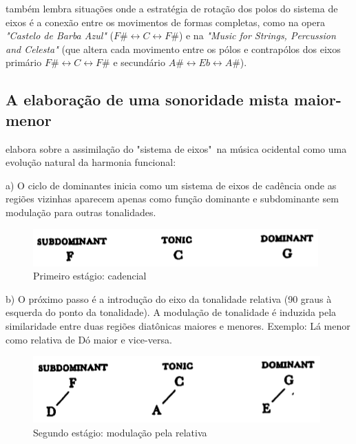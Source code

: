 \documentclass[
	12pt,				%
	openright,			%
	twoside,			%
	a4paper,			%
	english,			%
	french,				%
	spanish,			%
	brazil				%
	]{abntex2}
\begin{document}
 também lembra situações onde a estratégia de rotação dos polos do sistema de eixos é a conexão entre os movimentos de formas completas, como na opera \textit{"Castelo de Barba Azul"} ($F\# \leftrightarrow  C \leftrightarrow F\#$) e na \textit{"Music for Strings, Percussion and Celesta" } (que altera cada movimento entre os pólos e contrapólos dos eixos primário $F\# \leftrightarrow  C \leftrightarrow F\#$ e secundário $A\# \leftrightarrow  Eb \leftrightarrow A\#$).
\pagebreak


\subsection{A elaboração de uma sonoridade mista maior-menor}

 elabora sobre a assimilação do "sistema de eixos"\ na música ocidental como uma evolução natural da harmonia funcional: 

a) O ciclo de dominantes inicia como um sistema de eixos de cadência onde as regiões vizinhas aparecem apenas como função dominante e subdominante sem modulação para outras tonalidades. 

\begin{figure}[!h]
	\caption{\label{fig_grafico}Primeiro estágio: cadencial}
	\begin{center}
	    \includegraphics[scale=0.6]{axis/estagio01.png}
	\end{center}
\end{figure}


b) O próximo passo é a introdução do eixo da tonalidade relativa (90 graus à esquerda do ponto da tonalidade). A modulação de tonalidade é induzida pela similaridade entre duas regiões diatônicas maiores e menores. Exemplo: Lá menor como relativa de Dó maior e vice-versa.

\begin{figure}[!h]
	\caption{\label{fig_grafico}Segundo estágio: modulação pela relativa}
	\begin{center}
	    \includegraphics[scale=0.6]{axis/estagio02.png}
	\end{center}
\end{figure}
\end{document}
